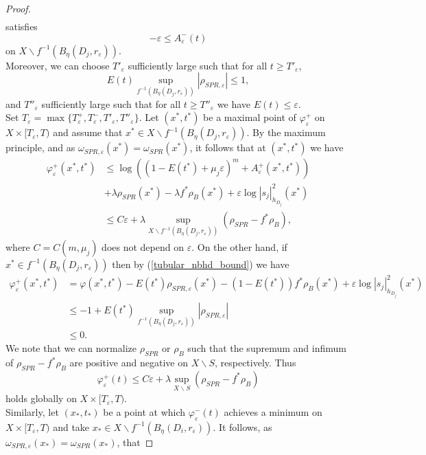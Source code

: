 \documentclass[12pt]{article}
\numberwithin{equation}{section}
\newcommand{\e}{\varepsilon}
\begin{document}
\begin{proof}
\begin{align*}
\end{align*}
satisfies
\begin{equation*}
    - \e \leq A^-_{\e}(t)
\end{equation*}
on $X \backslash f^{-1}(B_{\eta}(D_j,r_{\e}))$.\\
Moreover, we can choose $T'_{\e}$ sufficiently large such that for all $t \geq T'_{\e}$,
\begin{equation*}
    E(t) \sup_{f^{-1}(B_{\eta}(D_j,r_\e))}|\rho_{SPR,\e}| \leq 1,
\end{equation*}
and $T''_{\e}$ sufficiently large such that for all $t \geq T''_{\e}$ we have $E(t) \leq \e$.\\
Set $T_{\e} = \max\{T_{\e}^+, T_{\e}^{-}, T'_{\e}, T''_{\e}\}$. Let $(x^*,t^*)$ be a maximal point of $\varphi_{\e}^{+}$ on $X \times [T_\e,T)$ and assume that $x^* \in X \backslash f^{-1}(B_{\eta}(D_j, r_\e))$. By the maximum principle, and as $\omega_{SPR,\e}(x^*) = \omega_{SPR}(x^*)$, it follows that at $(x^*,t^*)$ we have
\begin{align*}
    \varphi_{\e}^{+}(x^*,t^*) &\leq \log \left((1-E(t^*)+\mu_j \e)^m + A^+_{\e}(x^*,t^*)\right)\\
    &+ \lambda \rho_{SPR}(x^*) - \lambda f^* \rho_B(x^*) + \e \log |s_j|^2_{h_{D_j}}(x^*)\\
    &\leq C \e + \lambda \sup_{X \backslash f^{-1}(B_{\eta}(D_j, r_\e))} (\rho_{SPR}-f^*\rho_B),
\end{align*}
where $C = C(m,\mu_j)$ does not depend on $\e$. On the other hand, if $x^* \in f^{-1}(B_{\eta}(D_j,r_\e))$ then by (\ref{tubular_nbhd_bound}) we have
\begin{align*}
    \varphi^+_{\e}(x^*,t^*) &= \varphi(x^*,t^*) - E(t^*) \rho_{SPR,\e}(x^*) - (1-E(t^*)) f^*\rho_{B}(x^*) + \e \log |s_j|^2_{h_{D_j}}(x^*)\\
    &\leq -1 + E(t^*) \sup_{f^{-1}(B_{\eta}(D_j,r_\e))} |\rho_{SPR,\e}|\\
    &\leq 0.
\end{align*}
We note that we can normalize $\rho_{SPR}$ or $\rho_B$ such that the supremum and infimum of $\rho_{SPR} - f^*\rho_B$ are positive and negative on $X \backslash S$, respectively. Thus
\begin{equation*}
    \varphi^+_{\e}(t) \leq C\e + \lambda \sup_{X\backslash S} (\rho_{SPR}-f^*\rho_B)
\end{equation*}
holds globally on $X \times [T_\e,T)$.\\
Similarly, let $(x_*,t_*)$ be a point at which $\varphi_{\e}^-(t)$ achieves a minimum on $X \times [T_\e,T)$ and take $x_* \in X \backslash f^{-1}(B_{\eta}(D_i,r_\e))$. It follows, as $\omega_{SPR,\e}(x_*) = \omega_{SPR}(x_*)$, that 

\end{proof}
\end{document}
